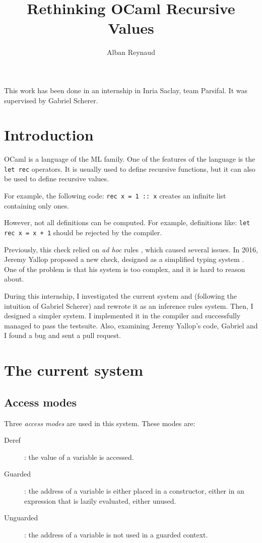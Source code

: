 \documentclass{article}
\title{Rethinking OCaml Recursive Values}
\author{Alban Reynaud}
\date{}
\begin{document}
\maketitle

This work has been done in an internship in Inria Saclay, team Parsifal. It was
supervised by Gabriel Scherer.

\section{Introduction}
OCaml is a language of the ML family. One of the features of the language is the
\lstinline|let rec| operators. It is usually used to define recursive
functions, but it can also be used to define recursive values.

For example, the following code: \lstinline|rec x = 1 :: x| creates an infinite
list containing only ones.

However, not all definitions can be computed. For example, definitions like:
\lstinline|let rec x = x + 1| should be rejected by the compiler.

Previously, this check relied on \textit{ad hoc} rules \cite{PreviousRules},
which caused several issues. In 2016, Jeremy Yallop proposed a new check,
designed as a simplified typing system \cite{Yallop}. One of the problem is that
his system is too complex, and it is hard to reason about.

During this internship, I investigated the current system and (following the
intuition of Gabriel Scherer) and rewrote it as an inference rules system. Then,
I designed a simpler system. I implemented it in the compiler and successfully
managed to pass the testsuite. Also, examining Jeremy Yallop's code, Gabriel and
I found a bug and sent a pull request.

\section{The current system}

\subsection{Access modes}
Three \textit{access modes} are used in this system. These modes are:
\begin{description}
  \item[Deref] : the value of a variable is accessed.
  \item[Guarded] : the address of a variable is either placed in a constructor,
    either in an expression that is lazily evaluated, either unused.
  \item[Unguarded] : the address of a variable is not used in a guarded
    context.
\end{description}
\end{document}
